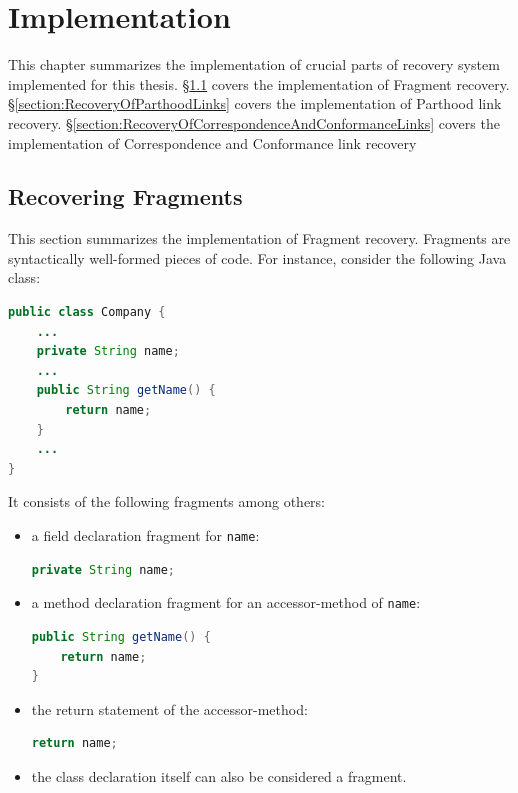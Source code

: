 \chapter{Implementation}
\label{chapter:Implementation}
This chapter summarizes the implementation of crucial parts of recovery system implemented for this thesis.
§\ref{section:RecoveringFragments} covers the implementation of \gls{Fragment} recovery.
§\ref{section:RecoveryOfParthoodLinks} covers the implementation of \gls{Parthood} link recovery.
§\ref{section:RecoveryOfCorrespondenceAndConformanceLinks} covers the implementation of \gls{Correspondence} and \gls{Conformance} link recovery

\section{Recovering Fragments}
\label{section:RecoveringFragments}
This section summarizes the implementation of \gls{Fragment} recovery.
\Glspl{Fragment} are syntactically well-formed pieces of code.
For instance, consider the following \gls{Java} class:
\begin{lstlisting}[language=Java,numbers=none]
public class Company {
	...
	private String name;
	...
	public String getName() {
		return name;
	}
	...
}
\end{lstlisting}
It consists of the following fragments among others:
\begin{itemize}
\item
a field declaration fragment for \texttt{name}:
\begin{lstlisting}[language=Java,numbers=none]
private String name;
\end{lstlisting}
\item
a method declaration fragment for an accessor-method of \texttt{name}:
\begin{lstlisting}[language=Java,numbers=none]
public String getName() {
	return name;
}
\end{lstlisting}
\item
the return statement of the accessor-method:
\begin{lstlisting}[language=Java,numbers=none]
return name;
\end{lstlisting}
\item
the class declaration itself can also be considered a fragment.
\end{itemize}

